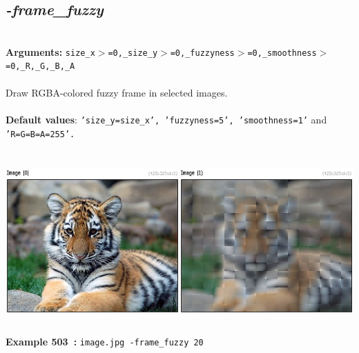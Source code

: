 \documentclass[a4paper,11pt,twoside]{book}
\begin{document}
\subsection{\emph{-frame\_fuzzy} }\vspace*{-0.5em}
~\\\textbf{Arguments: } 
{\small \texttt{size\_x$>$=0,\_size\_y$>$=0,\_fuzzyness$>$=0,\_smoothness$>$=0,\_R,\_G,\_B,\_A}}\\~\\
Draw RGBA-colored fuzzy frame in selected images.
~\\~\\\textbf{Default values}: {\small \texttt{'size\_y=size\_x', 'fuzzyness=5', 'smoothness=1'} and \texttt{'R=G=B=A=255'.}}
\begin{center}\includegraphics[keepaspectratio=true,height=7cm,width=\textwidth]{img/gmic_def503.jpg}\\
{\footnotesize \textbf{Example 503~:} \texttt{image.jpg -frame\_fuzzy 20}}
\end{center}
\end{document}
